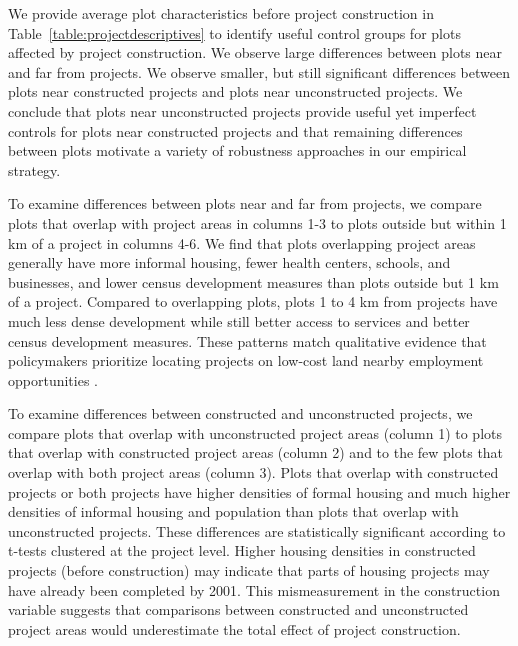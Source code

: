 \documentclass[12pt]{article}
\newcommand{\rv}{}
\begin{document}



\rv{We provide average plot characteristics before project construction in Table~\ref{table:projectdescriptives} to identify useful control groups for plots affected by project construction.  We observe large differences between plots near and far from projects.  We observe smaller, but still significant differences between plots near constructed projects and plots near unconstructed projects.  We conclude that plots near unconstructed projects provide useful yet imperfect controls for plots near constructed projects and that remaining differences between plots motivate a variety of robustness approaches in our empirical strategy.}

\rv{To examine differences between plots near and far from projects, we compare plots that overlap with project areas in columns 1-3 to plots outside but within 1 km of a project in columns 4-6.  We find that plots overlapping project areas generally have more informal housing, fewer health centers, schools, and businesses, and lower census development measures than plots outside but 1 km of a project.  Compared to overlapping plots, plots 1 to 4 km from projects have much less dense development while still better access to services and better census development measures.  These patterns match qualitative evidence that policymakers prioritize locating projects on low-cost land nearby employment opportunities \citep{bradlow2021weapons,bradlow2011housing}.}

\rv{To examine differences between constructed and unconstructed projects, we compare plots that overlap with unconstructed project areas (column 1) to plots that overlap with constructed project areas (column 2) and to the few plots that overlap with both project areas (column 3).  Plots that overlap with constructed projects or both projects have higher densities of formal housing and much higher densities of informal housing and population than plots that overlap with unconstructed projects.  These differences are statistically significant according to t-tests clustered at the project level.  Higher housing densities in constructed projects (before construction) may indicate that parts of housing projects may have already been completed by 2001.  This mismeasurement in the construction variable suggests that comparisons between constructed and unconstructed project areas would underestimate the total effect of project construction.}
\end{document}
